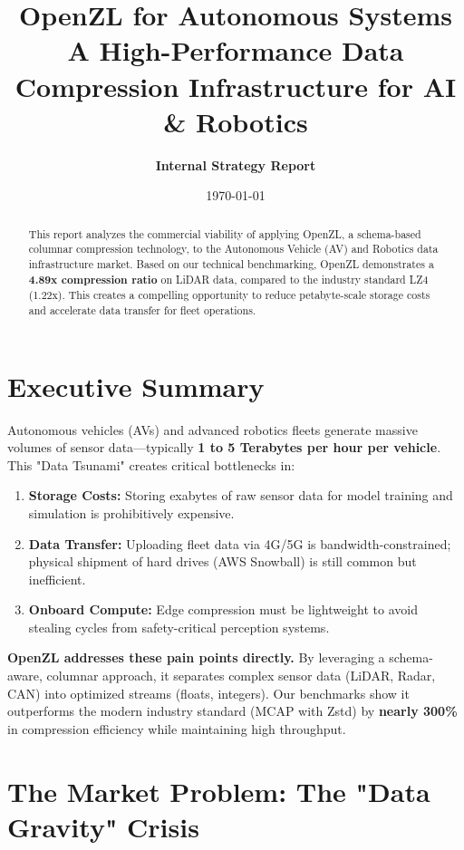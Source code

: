 \documentclass[11pt, letterpaper]{article}
\title{\textbf{\huge OpenZL for Autonomous Systems}\\ \Large A High-Performance Data Compression Infrastructure for AI \& Robotics}
\author{\textbf{Internal Strategy Report}}
\date{\today}
\begin{document}
\maketitle
\thispagestyle{empty}

\begin{abstract}
    This report analyzes the commercial viability of applying OpenZL, a schema-based columnar compression technology, to the Autonomous Vehicle (AV) and Robotics data infrastructure market. Based on our technical benchmarking, OpenZL demonstrates a \textbf{4.89x compression ratio} on LiDAR data, compared to the industry standard LZ4 (1.22x). This creates a compelling opportunity to reduce petabyte-scale storage costs and accelerate data transfer for fleet operations.
\end{abstract}

\tableofcontents
\newpage

\section{Executive Summary}
Autonomous vehicles (AVs) and advanced robotics fleets generate massive volumes of sensor data—typically \textbf{1 to 5 Terabytes per hour per vehicle}. This "Data Tsunami" creates critical bottlenecks in:
\begin{enumerate}
    \item \textbf{Storage Costs:} Storing exabytes of raw sensor data for model training and simulation is prohibitively expensive.
    \item \textbf{Data Transfer:} Uploading fleet data via 4G/5G is bandwidth-constrained; physical shipment of hard drives (AWS Snowball) is still common but inefficient.
    \item \textbf{Onboard Compute:} Edge compression must be lightweight to avoid stealing cycles from safety-critical perception systems.
\end{enumerate}

\textbf{OpenZL addresses these pain points directly.} By leveraging a schema-aware, columnar approach, it separates complex sensor data (LiDAR, Radar, CAN) into optimized streams (floats, integers). Our benchmarks show it outperforms the modern industry standard (MCAP with Zstd) by \textbf{nearly 300\%} in compression efficiency while maintaining high throughput.

\section{The Market Problem: The "Data Gravity" Crisis}
\end{document}
